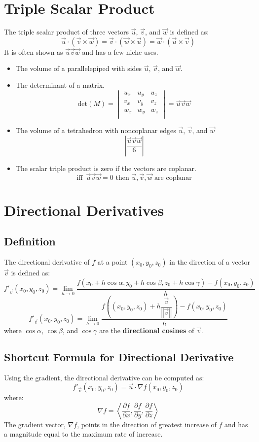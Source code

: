 \documentclass[a4paper,12pt,openany]{book}
\newcommand{\tsp}[3]{
    \vec{#1}\vec{#2}\vec{#3}
}
\newcommand{\abs}[1]{
    \left\vert#1\right\vert
}
\newcommand{\magn}[1]{
    \left\Vert#1\right\Vert
}
\begin{document}
\section{Triple Scalar Product}
The triple scalar product of three vectors \(\vec{u}\), \(\vec{v}\), and \(\vec{w}\) is defined as:
\[
    \vec{u} \cdot (\vec{v} \times \vec{w}) = \vec{v} \cdot (\vec{w} \times \vec{u}) = \vec{w} \cdot (\vec{u} \times \vec{v})
\]
It is often shown as $\tsp{u}{v}{w}$ and has a few niche uses.
\begin{itemize}
    \item The volume of a parallelepiped with sides \(\vec{u}\), \(\vec{v}\), and \(\vec{w}\).
    \item The determinant of a matrix.
    \[\text{det}(M) = 
    \begin{vmatrix}
        u_x & u_y & u_z \\
        v_x & v_y & v_z \\
        w_x & w_y & w_z \\
    \end{vmatrix}
        = \tsp{u}{v}{w}
    \]
    \item The volume of a tetrahedron with noncoplanar edges \(\vec{u}\), \(\vec{v}\), and \(\vec{w}\)
        \[
            \abs{\dfrac{\tsp{u}{v}{w}}{6}}
        \]
    \item The scalar triple product is zero if the vectors are coplanar. 
        \[
            \text{iff }\, \tsp{u}{v}{w} = 0 \text{ then } \vec{u}, \vec{v}, \vec{w} \text{ are coplanar}
        \]
\end{itemize}
\section{Directional Derivatives}
\subsection{Definition}
The directional derivative of \(f\) at a point \((x_0, y_0, z_0)\) in the direction of a vector \(\vec{v}\) is defined as:
\[
    f'_{\vec{v}}(x_0, y_0, z_0) = 
    \lim_{h \to 0}
    \dfrac{
        f(x_0 + h \cos \alpha, y_0 + h \cos \beta, z_0 + h \cos \gamma) - f(x_0, y_0, z_0)
    }{h}
\]
\[
    f'_{\vec{v}}(x_0, y_0, z_0) = 
    \lim_{h \to 0}
    \dfrac{
        f((x_0, y_0, z_0) + h\dfrac{\vec{v}}{\magn{\vec{v}}}) - f(x_0, y_0, z_0)}{h}
\]
where \(\cos \alpha\), \(\cos \beta\), and \(\cos \gamma\) are the \textbf{directional cosines} of \(\vec{v}\).

\subsection{Shortcut Formula for Directional Derivative}
Using the gradient, the directional derivative can be computed as:
\[
    f'_{\vec{v}}(x_0, y_0, z_0) = \vec{u} \cdot \nabla f(x_0, y_0, z_0)
\]
where:
\[
    \nabla f = \left\langle \dfrac{\partial f}{\partial x}, \dfrac{\partial f}{\partial y}, \dfrac{\partial f}{\partial z} \right\rangle
\]
The gradient vector, \(\nabla f\), points in the direction of greatest increase of \(f\) and has a magnitude equal to the maximum rate of increase.
\end{document}
